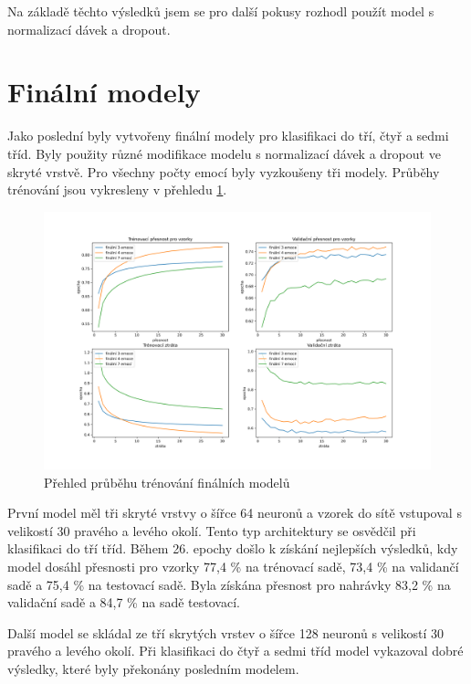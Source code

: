 \documentclass[FM,BP]{tulthesis}
\begin{document}
Na základě těchto výsledků jsem se pro další pokusy rozhodl použít model s normalizací dávek a dropout.

\clearpage
\section{Finální modely}
Jako poslední byly vytvořeny finální modely pro klasifikaci do tří, čtyř a sedmi tříd. Byly použity různé modifikace modelu s normalizací dávek a dropout ve skryté vrstvě. Pro všechny počty emocí byly vyzkoušeny tři modely. Průběhy trénování jsou vykresleny v přehledu \ref{fig:final_training_course}.

\begin{figure}[!htbp]
\centerline{\includegraphics[scale=.5]{training_course-final.png}}
\caption{Přehled průběhu trénování finálních modelů}
\label{fig:final_training_course}
\end{figure}
\FloatBarrier

První model měl tři skryté vrstvy o šířce 64 neuronů a vzorek do sítě vstupoval s velikostí 30 pravého a levého okolí. Tento typ architektury se osvědčil při klasifikaci do tří tříd. Během 26. epochy došlo k získání nejlepších výsledků, kdy model dosáhl přesnosti pro vzorky 77,4 \% na trénovací sadě, 73,4 \% na validančí sadě a 75,4 \% na testovací sadě. Byla získána přesnost pro nahrávky 83,2 \% na validační sadě a 84,7 \% na sadě testovací.

Další model se skládal ze tří skrytých vrstev o šířce 128 neuronů s velikostí 30 pravého a levého okolí. Při klasifikaci do čtyř a sedmi tříd model vykazoval dobré výsledky, které byly překonány posledním modelem.
\end{document}
